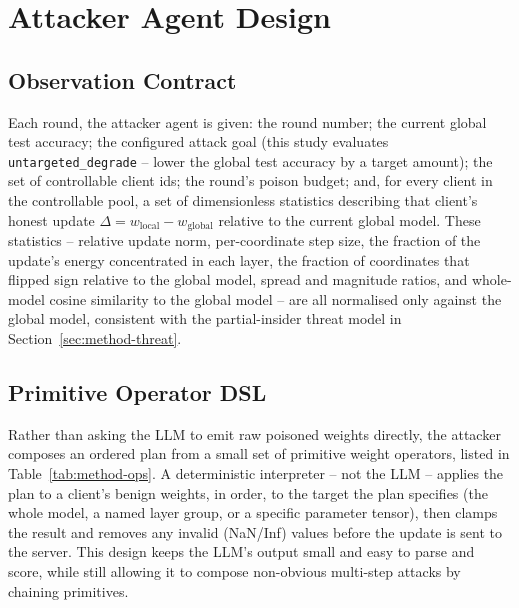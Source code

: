 \section{Attacker Agent Design}
\label{sec:method-attacker}

\subsection{Observation Contract}
Each round, the attacker agent is given: the round number; the current global test accuracy; the configured attack goal (this study evaluates \texttt{untargeted\_degrade} -- lower the global test accuracy by a target amount); the set of controllable client ids; the round's poison budget; and, for every client in the controllable pool, a set of dimensionless statistics describing that client's honest update $\Delta = w_{\text{local}} - w_{\text{global}}$ relative to the current global model. These statistics -- relative update norm, per-coordinate step size, the fraction of the update's energy concentrated in each layer, the fraction of coordinates that flipped sign relative to the global model, spread and magnitude ratios, and whole-model cosine similarity to the global model -- are all normalised only against the global model, consistent with the partial-insider threat model in Section~\ref{sec:method-threat}.

\subsection{Primitive Operator DSL}
Rather than asking the LLM to emit raw poisoned weights directly, the attacker composes an ordered plan from a small set of primitive weight operators, listed in Table~\ref{tab:method-ops}. A deterministic interpreter -- not the LLM -- applies the plan to a client's benign weights, in order, to the target the plan specifies (the whole model, a named layer group, or a specific parameter tensor), then clamps the result and removes any invalid (NaN/Inf) values before the update is sent to the server. This design keeps the LLM's output small and easy to parse and score, while still allowing it to compose non-obvious multi-step attacks by chaining primitives.

